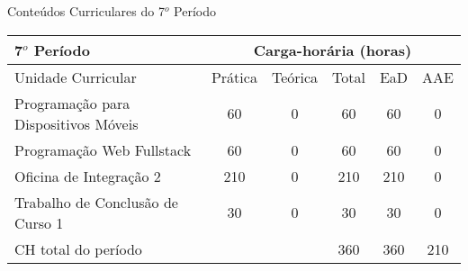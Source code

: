 \begin{quadro}[ht!]
\centering
\caption{Conteúdos Curriculares do 7$^o$ Período}\label{qua:periodo7}
\begin{tabular}{|p{8.0cm}|c|c|c|c|c|}
\hline
\rowcolor{blue1} 7$^o$ Período & \multicolumn{5}{|c|}{\centering Carga-horária (horas)} \\ \hline
\rowcolor{blue1} Unidade Curricular & Prática & Teórica & Total & EaD & AAE \\ \hline
Programação para Dispositivos Móveis & 60 & 0 & 60 & 60	&	0 \\	\hline
Programação Web Fullstack & 60 & 0 & 60 & 60	&	0 \\	\hline
Oficina de Integração 2 & 210 & 0 & 210 & 210	&	0 \\	\hline
Trabalho de Conclusão de Curso 1 & 30 & 0 & 30 & 30	&	0 \\	\hline
CH total do período & \multicolumn{2}{p{3.3cm}|}{\cellcolor{blue1}} & 360 & 360	&	210 \\ \hline
\end{tabular} \end{quadro}